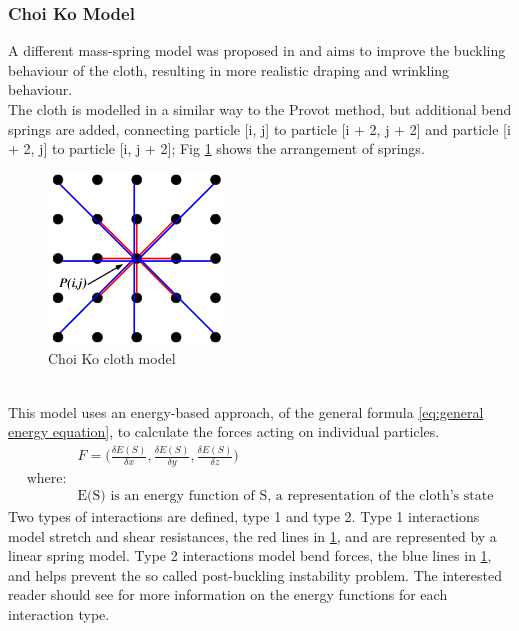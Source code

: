 \subsubsection{Choi Ko Model}
A different mass-spring model was proposed in \textcite{Choi2002} and aims to improve the buckling behaviour of the cloth, resulting in more realistic draping and wrinkling behaviour.
\\The cloth is modelled in a similar way to the Provot method, but additional bend springs are added, connecting particle [i, j] to particle [i + 2, j + 2] and particle [i + 2, j] to particle [i, j + 2]; Fig \ref{fig:choi ko model} shows the arrangement of springs.
\begin{figure}[tp]
   \begin{center}
     \includegraphics{Figures/choi_ko_model.png}
   \end{center}
   \caption[Choi Ko cloth model]{Choi Ko cloth model \parencite[2]{Choi2002}}
   \label{fig:choi ko model}
\end{figure}
\\This model uses an energy-based approach, of the general formula \ref{eq:general energy equation}\parencite[3]{Bartels2014}, to calculate the forces acting on individual particles.
\begin{equation}
\begin{split}
\label{eq:general energy equation}
  &F = \bigg(\frac{\delta E(S)}{\delta x}, \frac{\delta E(S)}{\delta y}, \frac{\delta E(S)}{\delta z}\bigg)
  \\\text{where:}
  \\&\text{E(S) is an energy function of S, a representation of the cloth's state}
\end{split}
\end{equation}
Two types of interactions are defined, type 1 and type 2. Type 1 interactions model stretch and shear resistances, the red lines in \ref{fig:choi ko model}, and are represented by a linear spring model. Type 2 interactions model bend forces, the blue lines in \ref{fig:choi ko model}, and helps prevent the so called post-buckling instability problem. The interested reader should see \textcite{Choi2002} for more information on the energy functions for each interaction type.

